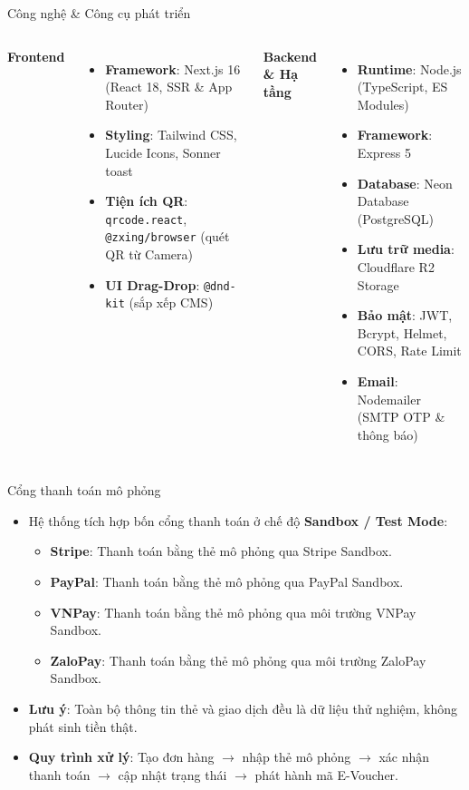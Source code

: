 \documentclass{beamer}
\begin{document}
\begin{frame}{Công nghệ \& Công cụ phát triển}
\begin{columns}
  \textbf{Frontend}
  \begin{itemize}
    \item \textbf{Framework}: Next.js 16 (React 18, SSR \& App Router)
    \item \textbf{Styling}: Tailwind CSS, Lucide Icons, Sonner toast
    \item \textbf{Tiện ích QR}: \texttt{qrcode.react}, \texttt{@zxing/browser} (quét QR từ Camera)
    \item \textbf{UI Drag-Drop}: \texttt{@dnd-kit} (sắp xếp CMS)
  \end{itemize}
  \textbf{Backend \& Hạ tầng}
  \begin{itemize}
    \item \textbf{Runtime}: Node.js (TypeScript, ES Modules)
    \item \textbf{Framework}: Express 5
    \item \textbf{Database}: Neon Database (PostgreSQL)
    \item \textbf{Lưu trữ media}: Cloudflare R2 Storage
    \item \textbf{Bảo mật}: JWT, Bcrypt, Helmet, CORS, Rate Limit
    \item \textbf{Email}: Nodemailer (SMTP OTP \& thông báo)
  \end{itemize}
\end{columns}
\end{frame}

\begin{frame}{Cổng thanh toán mô phỏng}
\begin{itemize}
  \item Hệ thống tích hợp bốn cổng thanh toán ở chế độ \textbf{Sandbox / Test Mode}:
    \begin{itemize}
      \item \textbf{Stripe}: Thanh toán bằng thẻ mô phỏng qua Stripe Sandbox.
      \item \textbf{PayPal}: Thanh toán bằng thẻ mô phỏng qua PayPal Sandbox.
      \item \textbf{VNPay}: Thanh toán bằng thẻ mô phỏng qua môi trường VNPay Sandbox.
      \item \textbf{ZaloPay}: Thanh toán bằng thẻ mô phỏng qua môi trường ZaloPay Sandbox.
    \end{itemize}
  \item \textbf{Lưu ý}: Toàn bộ thông tin thẻ và giao dịch đều là dữ liệu thử nghiệm, không phát sinh tiền thật.
  \item \textbf{Quy trình xử lý}: Tạo đơn hàng $\rightarrow$ nhập thẻ mô phỏng $\rightarrow$ xác nhận thanh toán $\rightarrow$ cập nhật trạng thái $\rightarrow$ phát hành mã E-Voucher.
\end{itemize}
\end{frame}
\end{document}
